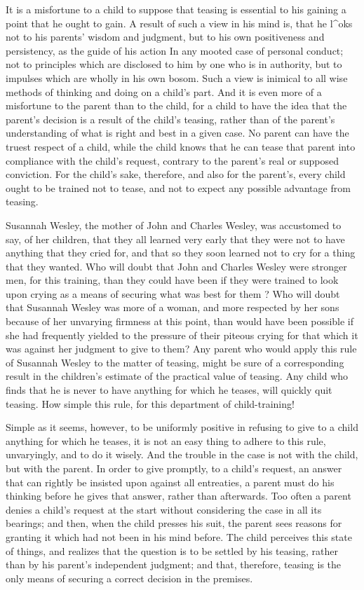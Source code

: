 \documentclass[
]{book}
\begin{document}
It is a misfortune to a child to suppose that teasing is essential to his gaining a point that he ought to gain. A result of such a view in his mind is, that he l\^{}oks not to his parents' wisdom and judgment, but to his own positiveness and persistency, as the guide of his action In any mooted case of personal conduct; not to principles which are disclosed to him by one who is in authority, but to impulses which are wholly in his own bosom. Such a view is inimical to all wise methods of thinking and doing on a child's part. And it is even more of a misfortune to the parent than to the child, for a child to have the idea that the parent's decision is a result of the child's teasing, rather than of the parent's understanding of what is right and best in a given case. No parent can have the truest respect of a child, while the child knows that he can tease that parent into compliance with the child's request, contrary to the parent's real or supposed conviction. For the child's sake, therefore, and also for the parent's, every child ought to be trained not to tease, and not to expect any possible advantage from teasing.

Susannah Wesley, the mother of John and Charles Wesley, was accustomed to say, of her children, that they all learned very early that they were not to have anything that they cried for, and that so they soon learned not to cry for a thing that they wanted. Who will doubt that John and Charles Wesley were stronger men, for this training, than they could have been if they were trained to look upon crying as a means of securing what was best for them ? Who will doubt that Susannah Wesley was more of a woman, and more respected by her sons because of her unvarying firmness at this point, than would have been possible if she had frequently yielded to the pressure of their piteous crying for that which it was against her judgment to give to them? Any parent who would apply this rule of Susannah Wesley to the matter of teasing, might be sure of a corresponding result in the children's estimate of the practical value of teasing. Any child who finds that he is never to have anything for which he teases, will quickly quit teasing. How simple this rule, for this department of child-training!

Simple as it seems, however, to be uniformly positive in refusing to give to a child anything for which he teases, it is not an easy thing to adhere to this rule, unvaryingly, and to do it wisely. And the trouble in the case is not with the child, but with the parent. In order to give promptly, to a child's request, an answer that can rightly be insisted upon against all entreaties, a parent must do his thinking before he gives that answer, rather than afterwards. Too often a parent denies a child's request at the start without considering the case in all its bearings; and then, when the child presses his suit, the parent sees reasons for granting it which had not been in his mind before. The child perceives this state of things, and realizes that the question is to be settled by his teasing, rather than by his parent's independent judgment; and that, therefore, teasing is the only means of securing a correct decision in the premises.
\end{document}
